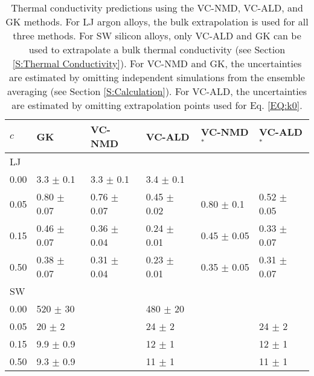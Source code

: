 \begin{center}
\begin{table}
\caption{\label{T:cond_table}Thermal conductivity predictions using the 
VC-NMD, VC-ALD, and GK methods. For LJ argon alloys, the bulk extrapolation 
is used for all three methods.  For SW silicon alloys, only VC-ALD and GK 
can be used to extrapolate a bulk thermal conductivity 
(see Section \ref{S:Thermal Conductivity}). For VC-NMD and GK, the 
uncertainties 
are estimated by omitting independent simulations from 
the ensemble averaging (see Section \ref{S:Calculation}). For VC-ALD, 
the uncertainties are estimated by omitting extrapolation points used for 
Eq. \eqref{EQ:k0}.}
\begin{tabular}{llllll}
\hline\hline
$c$ & GK & VC-NMD & VC-ALD & VC-NMD$^*$ & VC-ALD$^*$ \\
\hline
LJ  \\
\hline
0.00 & 3.3 $\pm$ 0.1 & 3.3 $\pm$ 0.1 & 3.4 $\pm$ 0.1 & & \\
0.05 & 0.80 $\pm$ 0.07 & 0.76 $\pm$ 0.07 & 0.45 $\pm$ 0.02 & 0.80 $\pm$ 0.1 & 0.52 $\pm$ 0.05 \\
0.15 & 0.46 $\pm$ 0.07 & 0.36 $\pm$ 0.04 & 0.24 $\pm$ 0.01 & 0.45 $\pm$ 0.05 & 0.33 $\pm$ 0.07 \\
0.50 & 0.38 $\pm$ 0.07 & 0.31 $\pm$ 0.04 & 0.23 $\pm$ 0.01 & 0.35 $\pm$ 0.05 & 0.31 $\pm$ 0.07 \\
\hline
SW \\
\hline
0.00 & 520 $\pm$ 30 & & 480 $\pm$ 20 & & \\
0.05 & 20 $\pm$  2 & & 24 $\pm$ 2 & & 24 $\pm$ 2 \\
0.15 & 9.9 $\pm$ 0.9 & & 12 $\pm$ 1 & & 12 $\pm$ 1 \\
0.50 & 9.3 $\pm$ 0.9 & & 11 $\pm$ 1 & & 11 $\pm$ 1 \\
\hline\hline
\end{tabular}
\end{table}
\end{center}



